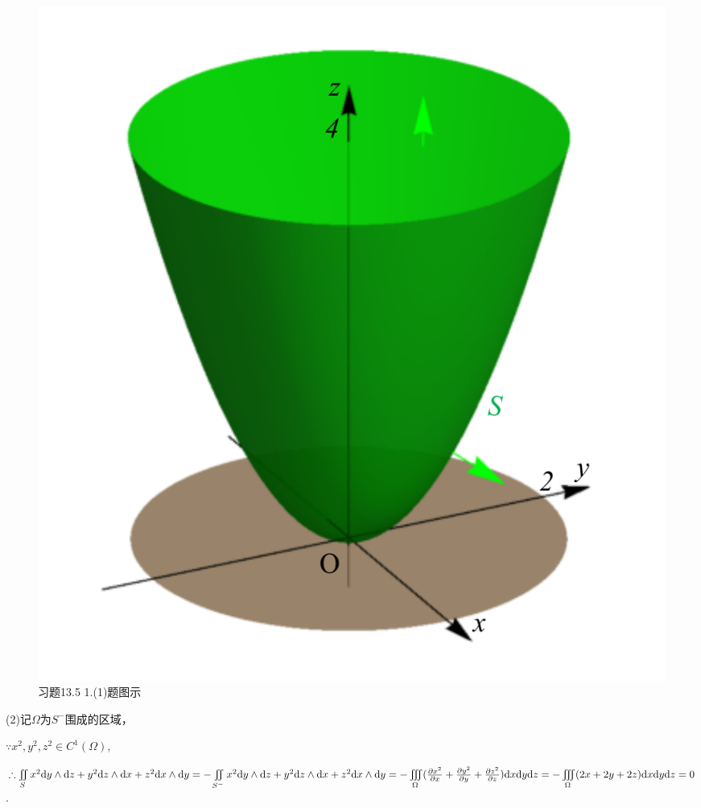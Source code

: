 \documentclass[12pt,UTF8]{ctexart}
\newcommand{\varIIInt}[5]{\iiint\limits_{#1}#2\mathrm d#3\mathrm d#4\mathrm d#5}
\newcommand{\md}[1]{\mathrm d#1}
\newcommand{\BSIInt}[2]{\iint\limits_{#1}#2}
\newcommand{\pp}[2]{\frac{\partial #1}{\partial #2}}
\begin{document}
\begin{enumerate}
\begin{figure}[H]
\begin{center}
\includegraphics[height=0.5\textheight]{Figures24/Fig13-5-1-1.pdf}
\end{center}
\caption{习题13.5 1.(1)题图示}
\label{13-5-1-1}
\end{figure}

(2)记$\Omega$为$S^-$围成的区域，

$\because x^2,y^2,z^2\in C^1(\Omega)$,

$\therefore\BSIInt S{x^2\md y\wedge\md z+y^2\md z\wedge\md x+z^2\md x\wedge\md y}=-\BSIInt{S^-}{x^2\md y\wedge\md z+y^2\md z\wedge\md x+z^2\md x\wedge\md y}\\
=-\varIIInt\Omega{(\pp{x^2}x+\pp{y^2}y+\pp{z^2}z)}xyz=-\varIIInt\Omega{(2x+2y+2z)}xyz=0$.


\end{enumerate}
\end{document}
